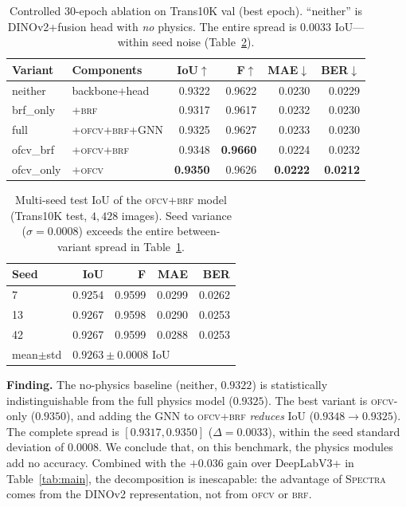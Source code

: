 \documentclass[conference]{IEEEtran}
\newcommand{\spectra}{\textsc{Spectra}}
\newcommand{\ofcv}{\textsc{ofcv}}
\newcommand{\brf}{\textsc{brf}}
\newcommand{\dinov}{DINOv2}
\newcommand{\iou}{IoU}
\newcommand{\best}[1]{\textbf{#1}}
\begin{document}
\begin{table}[t]
\centering
\caption{Controlled 30-epoch ablation on Trans10K val (best epoch).
``neither'' is \dinov{}+fusion head with \emph{no} physics. The entire spread is
$0.0033$ \iou---within seed noise (Table~\ref{tab:seeds}).}
\label{tab:ablation}
\setlength{\tabcolsep}{4pt}
\begin{tabular}{llrrrr}
\toprule
Variant & Components & \iou$\uparrow$ & F$\uparrow$ & MAE$\downarrow$ & BER$\downarrow$ \\
\midrule
neither   & backbone+head     & 0.9322 & 0.9622 & 0.0230 & 0.0229 \\
brf\_only & {+}\brf           & 0.9317 & 0.9617 & 0.0232 & 0.0230 \\
full      & {+}\ofcv{+}\brf{+}GNN & 0.9325 & 0.9627 & 0.0233 & 0.0230 \\
ofcv\_brf & {+}\ofcv{+}\brf   & 0.9348 & \best{0.9660} & 0.0224 & 0.0232 \\
ofcv\_only& {+}\ofcv          & \best{0.9350} & 0.9626 & \best{0.0222} & \best{0.0212} \\
\bottomrule
\end{tabular}
\end{table}

\begin{table}[t]
\centering
\caption{Multi-seed test \iou{} of the \ofcv{+}\brf{} model (Trans10K test,
$4{,}428$ images). Seed variance ($\sigma=0.0008$) exceeds the entire
between-variant spread in Table~\ref{tab:ablation}.}
\label{tab:seeds}
\begin{tabular}{lrrrr}
\toprule
Seed & \iou & F & MAE & BER \\
\midrule
7  & 0.9254 & 0.9599 & 0.0299 & 0.0262 \\
13 & 0.9267 & 0.9598 & 0.0290 & 0.0253 \\
42 & 0.9267 & 0.9599 & 0.0288 & 0.0253 \\
\midrule
mean$\pm$std & \multicolumn{4}{l}{$0.9263\pm0.0008$ \iou} \\
\bottomrule
\end{tabular}
\end{table}

\textbf{Finding.} The no-physics baseline (neither, $0.9322$) is statistically
indistinguishable from the full physics model ($0.9325$). The best variant is
\ofcv-only ($0.9350$), and adding the GNN to \ofcv{+}\brf{} \emph{reduces}
\iou{} ($0.9348\!\to\!0.9325$). The complete spread is $[0.9317,0.9350]$
($\Delta=0.0033$), within the seed standard deviation of $0.0008$. We conclude
that, on this benchmark, the physics modules add no accuracy. Combined with the
$+0.036$ gain over DeepLabV3+ in Table~\ref{tab:main}, the decomposition is
inescapable: the advantage of \spectra{} comes from the \dinov{} representation,
not from \ofcv{} or \brf.
\end{document}
